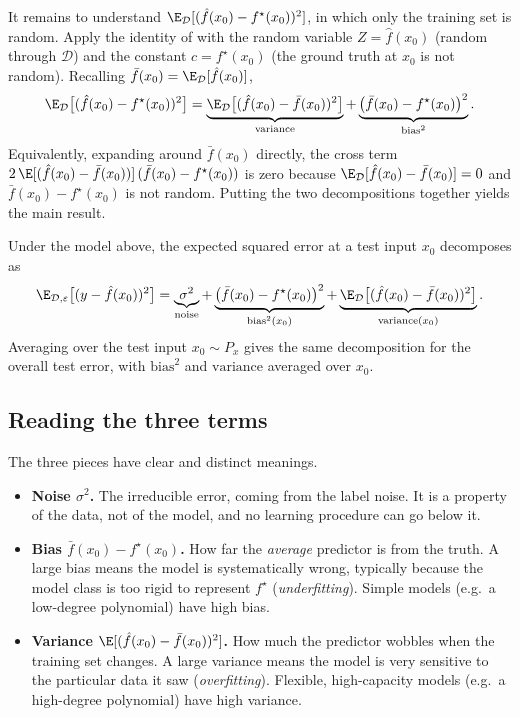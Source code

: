 It remains to understand $\E_{\mathcal{D}}[(\hat f(x_0) - f^\star(x_0))^2]$, in which
only the training set is random. Apply the
identity of  with the random variable $Z = \hat f(x_0)$
(random through $\mathcal{D}$) and the constant $c = f^\star(x_0)$ (the ground truth
at $x_0$ is not random). Recalling $\bar f(x_0) = \E_{\mathcal{D}}[\hat
f(x_0)]$,
\[
\E_{\mathcal{D}}\big[(\hat f(x_0) - f^\star(x_0))^2\big]
= \underbrace{\E_{\mathcal{D}}\big[(\hat f(x_0) - \bar f(x_0))^2\big]}_{\text{variance}}
+ \underbrace{\big(\bar f(x_0) - f^\star(x_0)\big)^2}_{\text{bias}^2} .
\]
Equivalently, expanding around $\bar f(x_0)$ directly, the cross term
$2\,\E[(\hat f(x_0) - \bar f(x_0))]\,(\bar f(x_0) - f^\star(x_0))$ is zero
because $\E_{\mathcal{D}}[\hat f(x_0) - \bar f(x_0)] = 0$ and $\bar f(x_0) -
f^\star(x_0)$ is not random. Putting the two decompositions together yields the main
result.

\begin{thm}
Under the model above, the expected squared error at a test input $x_0$ decomposes as
\[
\E_{\mathcal{D}, \varepsilon}\big[(y - \hat f(x_0))^2\big]
= \underbrace{\sigma^2}_{\text{noise}}
+ \underbrace{\big(\bar f(x_0) - f^\star(x_0)\big)^2}_{\text{bias}^2(x_0)}
+ \underbrace{\E_{\mathcal{D}}\big[(\hat f(x_0) - \bar f(x_0))^2\big]}_{\text{variance}(x_0)} .
\]
Averaging over the test input $x_0 \sim P_x$ gives the same decomposition for the
overall test error, with $\mathrm{bias}^2$ and $\mathrm{variance}$ averaged over
$x_0$.
\end{thm}

\subsection{Reading the three terms}

The three pieces have clear and distinct meanings.
\begin{itemize}
    \item \textbf{Noise $\sigma^2$.} The irreducible error, coming from the label
    noise. It is a property of the data, not of the model, and no learning
    procedure can go below it.
    \item \textbf{Bias $\bar f(x_0) - f^\star(x_0)$.} How far the \emph{average}
    predictor is from the truth. A large bias means the model is systematically
    wrong, typically because the model class is too rigid to represent $f^\star$
    (\emph{underfitting}). Simple models (e.g.\ a low-degree polynomial) have high
    bias.
    \item \textbf{Variance $\E[(\hat f(x_0) - \bar f(x_0))^2]$.} How much the
    predictor wobbles when the training set changes. A large variance means the model
    is very sensitive to the particular data it saw (\emph{overfitting}). Flexible,
    high-capacity models (e.g.\ a high-degree polynomial) have high variance.
\end{itemize}

